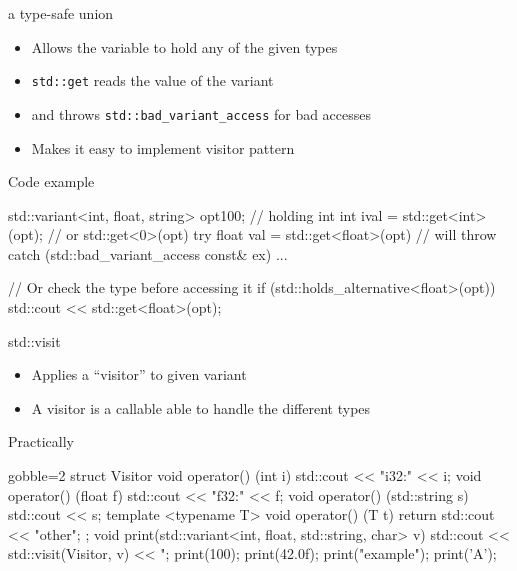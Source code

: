 \begin{frame}[fragile]
  \begin{block}{a type-safe union}
    \begin{itemize}
    \item Allows the variable to hold any of the given types
    \item \texttt{std::get} reads the value of the variant
    \item and throws \texttt{std::bad_variant_access} for bad accesses
    \item Makes it easy to implement visitor pattern
    \end{itemize}
  \end{block}
  \begin{exampleblock}{Code example}
    \small
    \begin{cppcode*}{}
      std::variant<int, float, string> opt{100}; // holding int
      int ival = std::get<int>(opt); // or std::get<0>(opt)
      try {
        float val = std::get<float>(opt) // will throw
      } catch (std::bad_variant_access const& ex) {...}

      // Or check the type before accessing it
      if (std::holds_alternative<float>(opt))
          std::cout << std::get<float>(opt);
    \end{cppcode*}
  \end{exampleblock}

\end{frame}

\begin{frame}[fragile]
  \begin{block}{std::visit}
    \begin{itemize}
    \item Applies a ``visitor'' to given variant
    \item A visitor is a callable able to handle the different types
    \end{itemize}
  \end{block}
  \begin{exampleblock}{Practically}
    \small
    \begin{cppcode*}{gobble=2}
      struct Visitor {
        void operator() (int i) { std::cout << "i32:" << i;}
        void operator() (float f) { std::cout << "f32:" << f;}
        void operator() (std::string s) { std::cout << s;}
        template <typename T>
        void operator() (T t) { return std::cout << "other"; }
      };
      void print(std::variant<int, float, std::string, char> v) {
        std::cout << std::visit(Visitor{}, v) << "\n;
      }
      print(100); print(42.0f); print("example"); print('A');
    \end{cppcode*}
  \end{exampleblock}
\end{frame}

